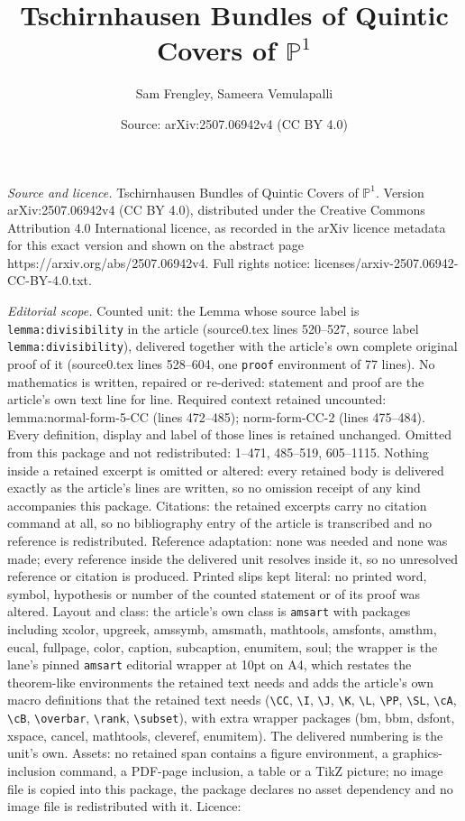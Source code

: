 \documentclass[10pt,a4paper]{amsart}
\title[Tschirnhausen Bundles of Quintic Covers of $\mathbb{P}^1$]{Tschirnhausen Bundles of Quintic Covers of $\mathbb{P}^1$}
\author{Sam Frengley, Sameera Vemulapalli}
\date{Source: arXiv:2507.06942v4 (CC BY 4.0)}
\begin{document}
\maketitle

\noindent\emph{Source and licence.} Tschirnhausen Bundles of Quintic Covers of $\mathbb{P}^1$. Version arXiv:2507.06942v4 (CC BY 4.0), distributed under the Creative Commons Attribution 4.0 International licence, as recorded in the arXiv licence metadata for this exact version and shown on the abstract page https://arxiv.org/abs/2507.06942v4. Full rights notice: licenses/arxiv-2507.06942-CC-BY-4.0.txt.\par\smallskip

\noindent\textit{Editorial scope.} Counted unit: the Lemma whose source label is \texttt{lemma:divisibility} in the article (source0.tex lines 520--527, source label \texttt{lemma:divisibility}), delivered together with the article's own complete original proof of it (source0.tex lines 528--604, one \texttt{proof} environment of 77 lines). No mathematics is written, repaired or re-derived: statement and proof are the article's own text line for line. Required context retained uncounted: lemma:normal-form-5-CC (lines 472--485); norm-form-CC-2 (lines 475--484). Every definition, display and label of those lines is retained unchanged. Omitted from this package and not redistributed: 1--471, 485--519, 605--1115. Nothing inside a retained excerpt is omitted or altered: every retained body is delivered exactly as the article's lines are written, so no omission receipt of any kind accompanies this package. Citations: the retained excerpts carry no citation command at all, so no bibliography entry of the article is transcribed and no reference is redistributed. Reference adaptation: none was needed and none was made; every reference inside the delivered unit resolves inside it, so no unresolved reference or citation is produced. Printed slips kept literal: no printed word, symbol, hypothesis or number of the counted statement or of its proof was altered. Layout and class: the article's own class is \texttt{amsart} with packages including xcolor, upgreek, amssymb, amsmath, mathtools, amsfonts, amsthm, eucal, fullpage, color, caption, subcaption, enumitem, soul; the wrapper is the lane's pinned \texttt{amsart} editorial wrapper at 10pt on A4, which restates the theorem-like environments the retained text needs and adds the article's own macro definitions that the retained text needs (\texttt{\textbackslash CC}, \texttt{\textbackslash I}, \texttt{\textbackslash J}, \texttt{\textbackslash K}, \texttt{\textbackslash L}, \texttt{\textbackslash PP}, \texttt{\textbackslash SL}, \texttt{\textbackslash cA}, \texttt{\textbackslash cB}, \texttt{\textbackslash overbar}, \texttt{\textbackslash rank}, \texttt{\textbackslash subset}), with extra wrapper packages (bm, bbm, dsfont, xspace, cancel, mathtools, cleveref, enumitem). The delivered numbering is the unit's own. Assets: no retained span contains a figure environment, a graphics-inclusion command, a PDF-page inclusion, a table or a TikZ picture; no image file is copied into this package, the package declares no asset dependency and no image file is redistributed with it. Licence: 
\end{document}
